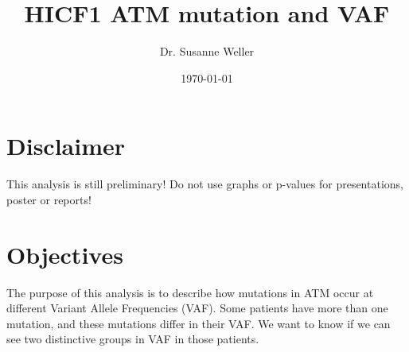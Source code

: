 \documentclass[a4paper,11pt]{article}
\title{HICF1 ATM mutation and VAF}
\author{Dr. Susanne Weller}
\date{\today}
\begin{document}
\maketitle
\section*{Disclaimer}
This analysis is still preliminary! Do not use graphs or p-values for presentations, poster or reports!
\section*{Objectives}
The purpose of this analysis is to describe how mutations in ATM occur at different Variant Allele Frequencies (VAF). Some patients have more than one mutation, and these mutations differ in their VAF. We want to know if we can see two distinctive groups in VAF in those patients.
\end{document}
